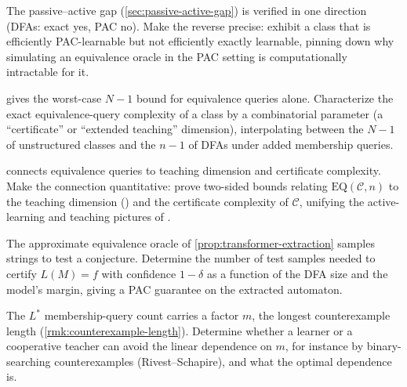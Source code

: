 \begin{openprob}
\label{op:reverse-separation}
The passive--active gap (\cref{sec:passive-active-gap}) is verified in one direction (DFAs: exact yes, PAC no).  Make the reverse precise: exhibit a class that is efficiently PAC-learnable but not efficiently exactly learnable, pinning down why simulating an equivalence oracle in the PAC setting is computationally intractable for it.
\end{openprob}

\begin{openprob}
\label{op:eq-sharp}
 gives the worst-case $N-1$ bound for equivalence queries alone.  Characterize the exact equivalence-query complexity of a class by a combinatorial parameter (a ``certificate'' or ``extended teaching'' dimension), interpolating between the $N-1$ of unstructured classes and the $n-1$ of DFAs under added membership queries.
\end{openprob}

\begin{openprob}
\label{op:query-teaching}
 connects equivalence queries to teaching dimension and certificate complexity.  Make the connection quantitative: prove two-sided bounds relating $\mathrm{EQ}(\mathcal{C}, n)$ to the teaching dimension () and the certificate complexity of $\mathcal{C}$, unifying the active-learning and teaching pictures of .
\end{openprob}

\begin{openprob}
\label{op:extraction-samples}
The approximate equivalence oracle of \cref{prop:transformer-extraction} samples strings to test a conjecture.  Determine the number of test samples needed to certify $L(M) = f$ with confidence $1 - \delta$ as a function of the DFA size and the model's margin, giving a PAC guarantee on the extracted automaton.
\end{openprob}

\begin{openprob}
\label{op:counterexample-length}
The $L^*$ membership-query count carries a factor $m$, the longest counterexample length (\cref{rmk:counterexample-length}).  Determine whether a learner or a cooperative teacher can avoid the linear dependence on $m$, for instance by binary-searching counterexamples (Rivest--Schapire), and what the optimal dependence is.
\end{openprob}


